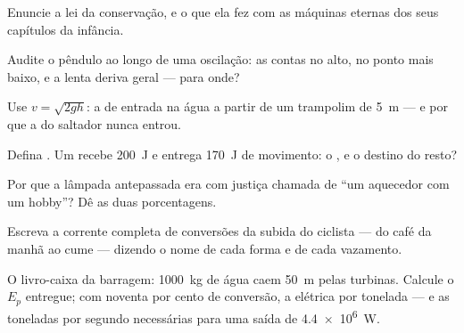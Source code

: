\begin{exercise}[$\star$]\label{exo:g9:energy-conversions:3}
Enuncie a lei da conservação, e o que ela fez com as máquinas eternas
dos seus capítulos da infância.
\end{exercise}

\begin{exercise}[$\star$]\label{exo:g9:energy-conversions:4}
Audite o pêndulo ao longo de uma oscilação: as contas no alto, no
ponto mais baixo, e a lenta deriva geral --- para onde?
\end{exercise}

\begin{exercise}[$\star$]\label{exo:g9:energy-conversions:5}
Use $v = \sqrt{2 g h}$: a  de entrada na água a partir de
um trampolim de \qty{5}{m} --- e por que a  do saltador nunca
entrou.
\end{exercise}

\begin{exercise}[$\star$]\label{exo:g9:energy-conversions:6}
Defina . Um  recebe \qty{200}{J} e entrega
\qty{170}{J} de movimento: o , e o destino do resto?
\end{exercise}

\begin{exercise}[$\star$]\label{exo:g9:energy-conversions:7}
Por que a lâmpada antepassada era com justiça chamada de ``um
aquecedor com um hobby''? Dê as duas porcentagens.
\end{exercise}

\begin{exercise}[$\star$]\label{exo:g9:energy-conversions:8}
Escreva a corrente completa de conversões da subida do ciclista ---
do café da manhã ao cume --- dizendo o nome de cada forma e de cada
vazamento.
\end{exercise}

\begin{exercise}[$\star\star$]\label{exo:g9:energy-conversions:9}
O livro-caixa da barragem: \qty{1000}{kg} de água caem \qty{50}{m}
pelas turbinas. Calcule o $E_p$ entregue; com noventa por cento de
conversão, a  elétrica por tonelada --- e as toneladas por
segundo necessárias para uma saída de \qty{4.4e6}{W}.
\end{exercise}

